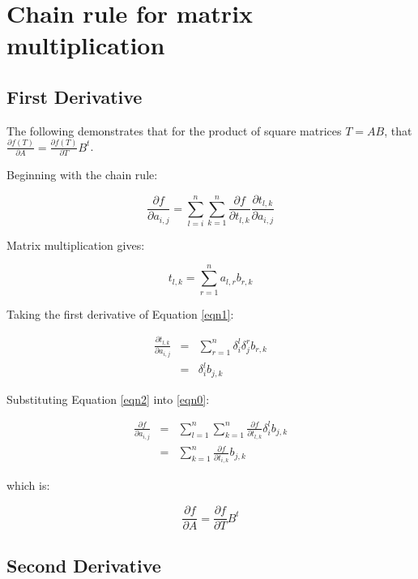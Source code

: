 \documentclass{report}
\begin{document}
\section{Chain rule for matrix multiplication}

\subsection{First Derivative}

The following demonstrates that for the product of square matrices $T = A B$,
that $\frac{\partial f(T)}{\partial A} = \frac{\partial f(T)}{\partial T} B^t$.

Beginning with the chain rule:

\begin{equation} 
\label{eqn0}
\frac{\partial f}{\partial a_{i,j}} = 
\sum_{l=i}^{n} \sum_{k=1}^{n} 
\frac{\partial f}{\partial t_{l,k}} 
\frac{\partial t_{l,k}}{\partial a_{i,j}}
\end{equation}

Matrix multiplication gives:

\begin{equation}
\label{eqn1}
t_{l,k} = \sum_{r=1}^n a_{l,r} b_{r,k}
\end{equation}

Taking the first derivative of Equation \ref{eqn1}:

\begin{eqnarray}
\label{eqn2}
\frac{\partial t_{l,k}}{\partial a_{i,j}} 
  &=& \sum_{r=1}^n \delta_i^l \delta_j^r b_{r,k} \\
  &=& \delta_i^l b_{j,k}
\end{eqnarray}

Substituting Equation \ref{eqn2} into \ref{eqn0}:

\begin{eqnarray}
\label{eqn4}
\frac{\partial f}{\partial a_{i,j}} &=& \sum_{l=1}^n \sum_{k=1}^n
 \frac{\partial f}{\partial t_{l,k}} \delta_i^l b_{j,k} \\
&=& \sum_{k=1}^{n} \frac{ \partial f}{ \partial t_{i,k}} b_{j,k}
\end{eqnarray}

which is:

\begin{equation}
\frac{\partial f}{\partial A} = \frac{\partial f}{\partial T} B^t
\end{equation}


\subsection{Second Derivative}
\end{document}
